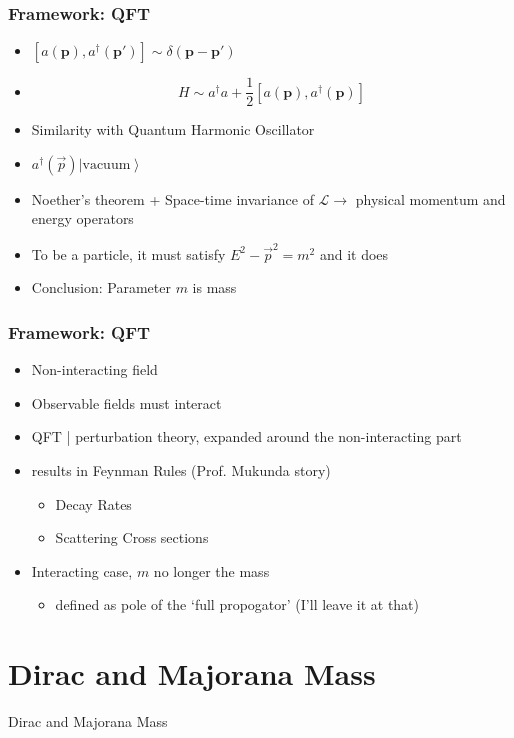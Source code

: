 \documentclass{beamer}
\begin{document}
\begin{frame}
	\frametitle{Framework: QFT}
		\begin{itemize}
			\item $[a(\mathbf{p}),a^{\dagger}(\mathbf{p}')]\sim\delta(\mathbf{p}-\mathbf{p}')$
			\pause
			\item \[
				H\sim a^{\dagger}a+\frac{1}{2}[a(\mathbf{p}),a^{\dagger}(\mathbf{p})]
				\]
			\pause
			\item Similarity with Quantum Harmonic Oscillator
			\pause
			\item $a^{\dagger}(\vec{p})\left|\text{vacuum}\right\rangle $
			\pause
			\item Noether's theorem + Space-time invariance of $\mathcal{L} \rightarrow$ physical momentum and energy operators
			\pause
			\item To be a particle, it must satisfy $E^{2}-\vec{p}^{2}=m^{2}$
			\pause
			and it does
			\pause
			\item Conclusion: Parameter $m$ is mass
		\end{itemize}
\end{frame}


\begin{frame}
	\frametitle{Framework: QFT}
		\begin{itemize}
			\item Non-interacting field
			\pause
			\item Observable fields must interact
			\pause
			\item QFT | perturbation theory, expanded around the non-interacting part
			\pause
			\item results in Feynman Rules \pause (Prof. Mukunda story)
			\pause
			\begin{itemize}
				\item Decay Rates
				\pause
				\item Scattering Cross sections
				\pause
			\end{itemize}
			\item Interacting case, $m$ no longer the mass
			\pause
			\begin{itemize}
				\item defined as pole of the `full propogator' \pause (I'll leave it at that)
			\end{itemize}
		\end{itemize}
\end{frame}

\section{Dirac and Majorana Mass}
\begin{frame}	
	\Huge{\centerline{Dirac and Majorana Mass}}
\end{frame}
\end{document}
